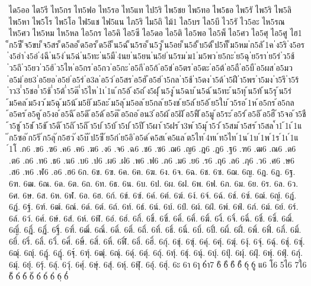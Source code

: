 {ได5ออ
ไต5รี
ไท5กร
ไท5ฟอ
ไท5รอ
ไท5แท
ไป5ริ
ไพ5ชย
ไพ5ทอ
ไพ5ธอ
ไพ5รั
ไพ5ริ
ไพ5ลิ
ไพ5หา
ไพ5โร
ไพ5โอ
ไฟ5แช
ไฟ5แน
ไภ5ริ
ไม5ถิ
ไม้1
ไล5บร
ไล5บี
ไว5รั
ไว5อะ
ไห5รณ
ไห5ศว
ไห5หม
ไห5หล
ไอ5กร
ไอ5คิ
ไอ5ซี
ไอ5ดอ
ไอ5ติ
ไอ5พอ
ไอ5พ็
ไอ5ศว
ไอ5ศุ
ไอ5ศู
ไฮ1
็ก5ซี
็จ5ขบ
็จ5สร
็ด5ลอ
็ด5อร
็ด5อึ
็น5ฉ่
็น5รอ
็น5วู
็น5อย
็น5อ้
็บ5ด้
็ป5ท็
็ม5หม
่ก5ลั
่1ค
่ง5ริ
่ง5อร
่ง5อำ
่ง5อ่
่4ฉี
่น5ง่
่น5ฉ่
่น5ทะ
่น5มื
่4นย
่น5ยน
่น5ย่
่น5รม
่ม1
่ม5พว
่ย5กะ
่ย5ฉุ
่ย5รา
่ย5ร่
่ว5ช้
่ว5ถึ
่ว5ยว
่ว5ฮ้
่ว5ไห
่อ5กร
่อ5กว
่อ5กะ
่อ5กี
่อ5ก้
่อ5ข่
่อ5ตร
่อ5ตะ
่อ5ต้
่อ5ถื
่อ5บื
่อ5ผส
่อ5มว
่อ5ม่
่อย3
่อ5ยอ
่อ5ย่
่อ5ร่
่อ3ล
่อ5ว่
่อ5สร
่อ5ฮั
่อ5ฮ่
่า5กล
่า5ช้
่า5ดง
่า5ด้
่า5ฝื
่า5พร
่า5มง
่า5รึ
่า5ร้
่าว3
่ำ5ชอ
่ำ5ช้
่ำ5ต้
่ำ5ต๊
่ำ5ไห
่1เ
่1แ
้ก5อ้
้ง5ถ่
้ง5ฝุ
้น5งู
้น5ฉบ
้น5ฉ่
้น5ทะ
้น5ทุ
้น5ท้
้น5รุ
้น5ร่
้ม5คล
้ม5งว
้ม5ฉุ
้ม5น้
้ม5ยิ
้ม5ละ
้ม5ลุ
้ม5อล
้ย5กล
้ย5งช
้ย5ล่
้ย5อ้
้ย5ใบ
้ว5รอ
้1ห
้อ5กร
้อ5กล
้อ5คร
้อ5คู
้อ5งอ
้อ5ฉี
้อ5ดึ
้อ5ด้
้อ5ต๊
้อ5ถอ
้อน3
้อ5ผ้
้อ5ฝั
้อ5ฟื
้อ5มู
้อ5ระ
้อ5ร่
้อ5อึ
้อ5ฮื
้า5จอ
้า5ชื
้า5ชู
้า5ช่
้า5ช้
้า5ดี
้า5ถิ
้า5ถึ
้า5บ่
้า5บ้
้า5บ๋
้า5ปี
้า5ผา
้า5ฝร
้า3พ
้า5มุ
้า5ว่
้า5สม
้า5สร
้า5สล
้ำ1
้1เ
้1แ
๊ก5ซอ
๊ก5ริ
๊ก5ลุ
๊ก5ฮว
๊ง5บ๊
๊ป5ซี
๊ย5ก่
๋ย5อิ
๋อ5ด๋
์ค5สเ
์ค5แล
์ต5ไท
์4ทเ
์ท5ไท
์1น
์1บ
์1พ
์1ร
์1เ
์1แ
์1โ
.ก6
.ข6
.ฃ6
.ค6
.ฅ6
.ฆ6
.ง6
.จ6
.ฉ6
.ช6
.ซ6
.ฌ6
.ญ6
.ฎ6
.ฏ6
.ฐ6
.ฑ6
.ฒ6
.ณ6
.ด6
.ต6
.ถ6
.ท6
.ธ6
.น6
.บ6
.ป6
.ผ6
.ฝ6
.พ6
.ฟ6
.ภ6
.ม6
.ย6
.ร6
.ฤ6
.ล6
.ฦ6
.ว6
.ศ6
.ษ6
.ส6
.ห6
.ฬ6
.อ6
.ฮ6
6ก.
6ข.
6ฃ.
6ค.
6ฅ.
6ฆ.
6ง.
6จ.
6ฉ.
6ช.
6ซ.
6ฌ.
6ญ.
6ฎ.
6ฏ.
6ฐ.
6ฑ.
6ฒ.
6ณ.
6ด.
6ต.
6ถ.
6ท.
6ธ.
6น.
6บ.
6ป.
6ผ.
6ฝ.
6พ.
6ฟ.
6ภ.
6ม.
6ย.
6ร.
6ล.
6ว.
6ศ.
6ษ.
6ส.
6ห.
6ฬ.
6อ.
6ฮ.
6ก์.
6ข์.
6ฃ์.
6ค์.
6ฅ์.
6ฆ์.
6ง์.
6จ์.
6ฉ์.
6ช์.
6ซ์.
6ฌ์.
6ญ์.
6ฎ์.
6ฏ์.
6ฐ์.
6ฑ์.
6ฒ์.
6ณ์.
6ด์.
6ต์.
6ถ์.
6ท์.
6ธ์.
6น์.
6บ์.
6ป์.
6ผ์.
6ฝ์.
6พ์.
6ฟ์.
6ภ์.
6ม์.
6ย์.
6ร์.
6ล์.
6ว์.
6ศ์.
6ษ์.
6ส์.
6ห์.
6ฬ์.
6อ์.
6ฮ์.
6กิ์.
6ขิ์.
6ฃิ์.
6คิ์.
6ฅิ์.
6ฆิ์.
6งิ์.
6จิ์.
6ฉิ์.
6ชิ์.
6ซิ์.
6ฌิ์.
6ญิ์.
6ฎิ์.
6ฏิ์.
6ฐิ์.
6ฑิ์.
6ฒิ์.
6ณิ์.
6ดิ์.
6ติ์.
6ถิ์.
6ทิ์.
6ธิ์.
6นิ์.
6บิ์.
6ปิ์.
6ผิ์.
6ฝิ์.
6พิ์.
6ฟิ์.
6ภิ์.
6มิ์.
6ยิ์.
6ริ์.
6ลิ์.
6วิ์.
6ศิ์.
6ษิ์.
6สิ์.
6หิ์.
6ฬิ์.
6อิ์.
6ฮิ์.
6กุ์.
6ขุ์.
6ฃุ์.
6คุ์.
6ฅุ์.
6ฆุ์.
6งุ์.
6จุ์.
6ฉุ์.
6ชุ์.
6ซุ์.
6ฌุ์.
6ญุ์.
6ฎุ์.
6ฏุ์.
6ฐุ์.
6ฑุ์.
6ฒุ์.
6ณุ์.
6ดุ์.
6ตุ์.
6ถุ์.
6ทุ์.
6ธุ์.
6นุ์.
6บุ์.
6ปุ์.
6ผุ์.
6ฝุ์.
6พุ์.
6ฟุ์.
6ภุ์.
6มุ์.
6ยุ์.
6รุ์.
6ลุ์.
6วุ์.
6ศุ์.
6ษุ์.
6สุ์.
6หุ์.
6ฬุ์.
6อุ์.
6ฮุ์.
6ะ
6า
6ๅ
6ำ7
6ิ
6ี
6ึ
6ื
6ุ
6ู
แ6
โ6
5ไ6
7ใ6
6็
6่
6้
6๊
6๋
6์
6ํ
6ฺ
6๎
}

